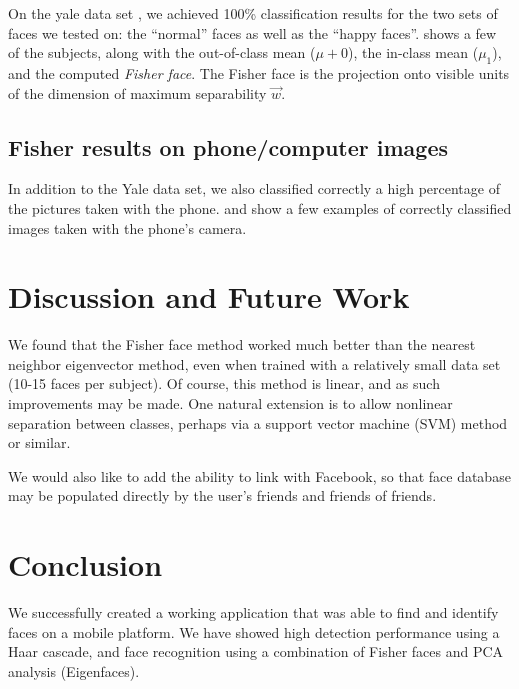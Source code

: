 On the yale data set \cite{YaleFace}, we achieved 100\% classification
results for the two sets of faces we tested on: the ``normal'' faces
as well as the ``happy faces''.   shows a
few of the subjects, along with the out-of-class mean ($\mu+0$), the
in-class mean ($\mu_1$), and the computed \emph{Fisher face}.  The
Fisher face is the projection onto visible units of the dimension of
maximum separability $\vec w$.




\subsection{Fisher results on phone/computer images}

In addition to the Yale data set, we also classified correctly a high
percentage of the pictures taken with the phone.
 and
 show a few examples of correctly
classified images taken with the phone's camera.





\section{Discussion and Future Work}

We found that the Fisher face method worked much better than the
nearest neighbor eigenvector method, even when trained with a
relatively small data set (10-15 faces per subject).  Of course, this
method is linear, and as such improvements may be made.  One natural
extension is to allow nonlinear separation between classes, perhaps
via a support vector machine (SVM) method or similar.

We would also like to add the ability to link with Facebook, so that
face database may be populated directly by the user's friends and
friends of friends.



\section{Conclusion}


We successfully created a working application that was able to find
and identify faces on a mobile platform.  We have showed high
detection performance using a Haar cascade, and face recognition using
a combination of Fisher faces and PCA analysis (Eigenfaces).

